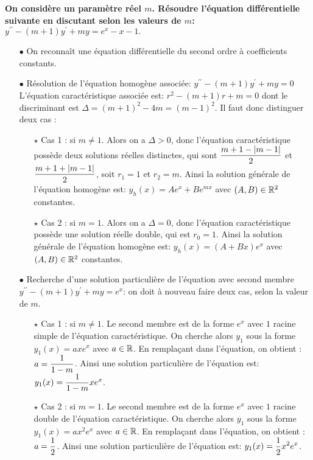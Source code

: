\documentclass[a4paper, 11pt,reqno]{article}
\begin{document}
\begin{correction}  \;
\textbf{On consid\`ere un param\`etre r\'eel $m$. R\'esoudre l'\'equation diff\'erentielle suivante en discutant selon les valeurs de $m$: $y^{\prime\prime}-(m+1)y^{\prime}+my=e^x-x-1.$}\\
\begin{itemize}
\item[$\bullet$] On reconna\^{i}t une \'equation diff\'erentielle du second ordre \`{a} coefficients constants.
\item[$\bullet$] R\'esolution de l'\'equation homog\`{e}ne associ\'ee: $y^{\prime\prime}-(m+1)y^{\prime}+my=0$\\
\noindent L'\'equation caract\'eristique associ\'ee est: $r^2-(m+1)r+m=0$ dont le discriminant est $\Delta=(m+1)^2-4m=(m-1)^2$. Il faut donc distinguer deux cas :
\begin{itemize}
\item[$\star$] Cas 1 : si $m\not=1$. Alors on a $\Delta > 0$, donc l'\'equation caract\'eristique poss\`ede deux solutions r\'eelles distinctes, qui sont $\displaystyle \frac{m+1-|m-1|}{2}$ et $\displaystyle \frac{m+1+|m-1|}{2}$, soit $r_1=1$ et $r_2=m$. Ainsi la solution g\'en\'erale de l'\'equation homog\`{e}ne est: $y_h(x) = Ae^x + Be^{mx}$ avec $(A,B)\in\mathbb{R}^2$ constantes.
\item[$\star$] Cas 2 : si $m=1$. Alors on a $\Delta = 0$, donc l'\'equation caract\'eristique poss\`ede une solution r\'eelle double, qui est $r_0=1$. Ainsi la solution g\'en\'erale de l'\'equation homog\`{e}ne est: $y_h(x) = (A+Bx)e^x$ avec $(A,B)\in\mathbb{R}^2$ constantes.
\end{itemize}
\item[$\bullet$] Recherche d'une solution particuli\`{e}re de l'\'equation avec second membre $y^{\prime\prime}-(m+1)y^{\prime}+my=e^x$: on doit \`a nouveau faire deux cas, selon la valeur de $m$.
\begin{itemize}
\item[$\star$] Cas 1 : si $m\not=1$. Le second membre est de la forme $e^{x}$ avec $1$ racine simple de l'\'equation caract\'eristique. On cherche alors $y_1$ sous la forme $y_1(x)=a x e^{x}$ avec $a \in \mathbb{R}$. En rempla\c cant dans l'\'equation, on obtient : $a=\displaystyle\frac{1}{1-m}$. Ainsi une solution particuli\`{e}re de l'\'equation est: $\displaystyle y_1(x)= \frac{1}{1-m} x e^x$.
\item[$\star$] Cas 2 : si $m=1$. Le second membre est de la forme $e^{x}$ avec $1$ racine double de l'\'equation caract\'eristique. On cherche alors $y_1$ sous la forme $y_1(x)=a x^2 e^{x}$ avec $a \in \mathbb{R}$. En rempla\c cant dans l'\'equation, on obtient : $a=\displaystyle\frac{1}{2}$. Ainsi une solution particuli\`{e}re de l'\'equation est: $y_1(x)= \displaystyle \frac{1}{2} x^2 e^x$.

\end{itemize}
\end{itemize}
\end{correction}
\end{document}

